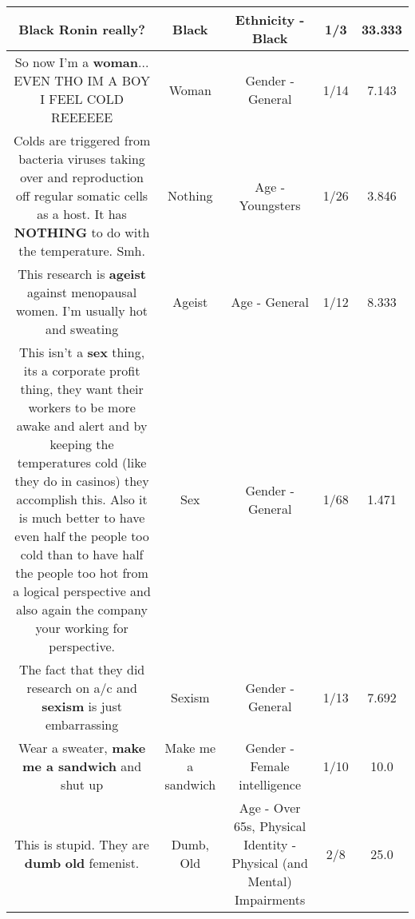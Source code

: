 \documentclass[11pt]{article}
\newlength\mylength
\begin{document}
\begin{center}
\begin{longtable}{|C{.65\mylength}|C{.30\mylength}|C{.12\mylength}|C{.12\mylength}|C{.12\mylength}|}
  \small \@\textbf{Black} Ronin really?\normalsize   & Black & Ethnicity - Black & 1/3 & 33.333 \\  \hline
  \small So now I'm a \textbf{woman}... EVEN THO IM A BOY I FEEL COLD REEEEEE\normalsize   & Woman & Gender - General & 1/14 & 7.143 \\  \hline
  \small Colds are triggered from bacteria viruses taking over and reproduction off regular somatic cells as a host. It has \textbf{NOTHING} to do with the temperature. Smh.\normalsize   & Nothing & Age - Youngsters & 1/26 & 3.846 \\  \hline
  \small This research is \textbf{ageist} against menopausal women. I'm usually hot and sweating\normalsize   & Ageist & Age - General & 1/12 & 8.333 \\  \hline
  \small This isn't a \textbf{sex} thing, its a corporate profit thing, they want their workers to be more awake and alert and by keeping the temperatures cold (like they do in casinos) they accomplish this.  Also it is much better to have even half the people too cold than to have half the people too hot from a logical perspective and also again the company your working for perspective.\normalsize   & Sex & Gender - General & 1/68 & 1.471 \\  \hline
  \small The fact that they did research on a/c and \textbf{sexism} is just embarrassing\normalsize   & Sexism & Gender - General & 1/13 & 7.692 \\  \hline
  \small Wear a sweater, \textbf{make me a sandwich} and shut up\normalsize   & Make me a sandwich & Gender - Female intelligence & 1/10 & 10.0 \\  \hline
  \small This is stupid. They are \textbf{dumb} \textbf{old} femenist.\normalsize   & Dumb, Old & Age - Over 65s, Physical Identity - Physical (and Mental) Impairments & 2/8 & 25.0 \\  \hline

\end{longtable}
\end{center}
\end{document}
